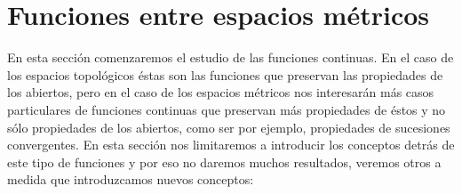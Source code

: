 \documentclass[12pt,a4paper]{book}
\begin{document}
\else
\fi

\section{Funciones entre espacios métricos}
En esta sección comenzaremos el estudio de las funciones continuas. En el caso de los espacios topológicos éstas son las funciones que preservan las propiedades de los abiertos, pero en el caso de los espacios métricos nos interesarán más casos particulares de funciones continuas que preservan más propiedades de éstos y no sólo propiedades de los abiertos, como ser por ejemplo, propiedades de sucesiones convergentes. En esta sección nos limitaremos a introducir los conceptos detrás de este tipo de funciones y por eso no daremos muchos resultados, veremos otros a medida que introduzcamos nuevos conceptos:
\end{document}
